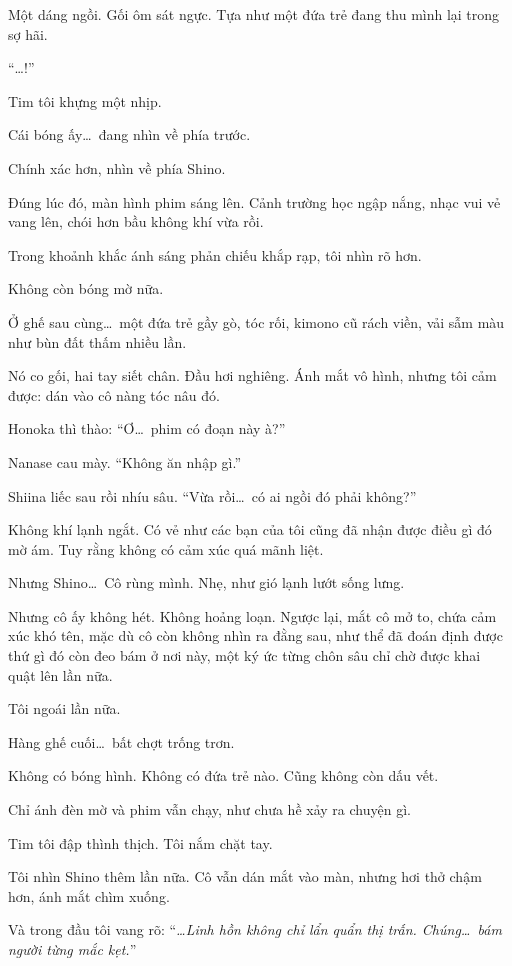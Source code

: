 \documentclass[../main.tex]{subfiles}
\begin{document}
Một dáng ngồi. Gối ôm sát ngực. Tựa như một đứa trẻ đang thu mình lại trong sợ hãi.

``\dots!''

Tim tôi khựng một nhịp.

Cái bóng ấy\dots\ đang nhìn về phía trước.

Chính xác hơn, nhìn về phía Shino.

Đúng lúc đó, màn hình phim sáng lên. Cảnh trường học ngập nắng, nhạc vui vẻ vang lên, chói hơn bầu không khí vừa rồi.

Trong khoảnh khắc ánh sáng phản chiếu khắp rạp, tôi nhìn rõ hơn.

Không còn bóng mờ nữa.

Ở ghế sau cùng\dots\ một đứa trẻ gầy gò, tóc rối, kimono cũ rách viền, vải sẫm màu như bùn đất thấm nhiều lần.

Nó co gối, hai tay siết chân. Đầu hơi nghiêng. Ánh mắt vô hình, nhưng tôi cảm được: dán vào cô nàng tóc nâu đó.

Honoka thì thào: ``Ơ\dots\ phim có đoạn này à?''

Nanase cau mày. ``Không ăn nhập gì.''

Shiina liếc sau rồi nhíu sâu. ``Vừa rồi\dots\ có ai ngồi đó phải không?''

Không khí lạnh ngắt. Có vẻ như các bạn của tôi cũng đã nhận được điều gì đó mờ ám. Tuy rằng không có cảm xúc quá mãnh liệt.

Nhưng Shino\dots\ Cô rùng mình. Nhẹ, như gió lạnh lướt sống lưng.

Nhưng cô ấy không hét. Không hoảng loạn. Ngược lại, mắt cô mở to, chứa cảm xúc khó tên, mặc dù cô còn không nhìn ra đằng sau, như thể đã đoán định được thứ gì đó còn đeo bám ở nơi này, một ký ức từng chôn sâu chỉ chờ được khai quật lên lần nữa.

Tôi ngoái lần nữa.

Hàng ghế cuối\dots\ bất chợt trống trơn.

Không có bóng hình. Không có đứa trẻ nào. Cũng không còn dấu vết.

Chỉ ánh đèn mờ và phim vẫn chạy, như chưa hề xảy ra chuyện gì.

Tim tôi đập thình thịch. Tôi nắm chặt tay.

Tôi nhìn Shino thêm lần nữa. Cô vẫn dán mắt vào màn, nhưng hơi thở chậm hơn, ánh mắt chìm xuống.

Và trong đầu tôi vang rõ: ``\textit{\dots Linh hồn không chỉ lẩn quẩn thị trấn. Chúng\dots\ bám người từng mắc kẹt.}''
\end{document}
